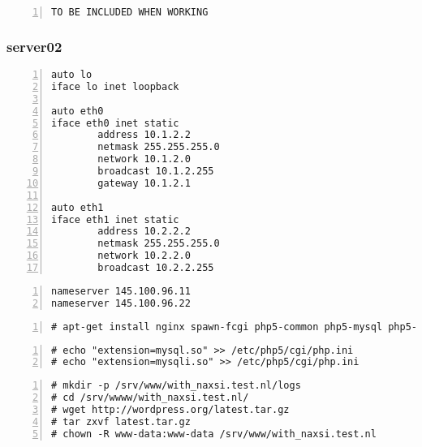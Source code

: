 \documentclass[Configuration]{subfiles}
\begin{document}
\begin{lstlisting}[frame=single,caption=/etc/nginx/nbs.rules,backgroundcolor=\color{gray},breaklines=true,numbers=left,]
TO BE INCLUDED WHEN WORKING
\end{lstlisting}

\subsubsection{server02}
\label{sec:server02_configuration}


\begin{lstlisting}[frame=single,caption=/etc/network/interfaces,backgroundcolor=\color{gray},breaklines=true,numbers=left,]
auto lo
iface lo inet loopback

auto eth0
iface eth0 inet static
        address 10.1.2.2
        netmask 255.255.255.0
        network 10.1.2.0
        broadcast 10.1.2.255
        gateway 10.1.2.1

auto eth1
iface eth1 inet static
        address 10.2.2.2
        netmask 255.255.255.0
        network 10.2.2.0
        broadcast 10.2.2.255
\end{lstlisting}

\begin{lstlisting}[frame=single,caption=/etc/resolv.conf,backgroundcolor=\color{gray},breaklines=true,numbers=left,]
nameserver 145.100.96.11
nameserver 145.100.96.22
\end{lstlisting}

\begin{lstlisting}[frame=single,caption=necessary packages,backgroundcolor=\color{gray},breaklines=true,numbers=left,]
# apt-get install nginx spawn-fcgi php5-common php5-mysql php5-xmlrpc php5-cgi php5-curl php5-gd php5-cli  php-apc php-pear php5-dev php5-imap php5-mcrypt
\end{lstlisting}

\begin{lstlisting}[frame=single,caption=/etc/php5/cgi/php.ini,backgroundcolor=\color{gray},breaklines=true,numbers=left,]
# echo "extension=mysql.so" >> /etc/php5/cgi/php.ini
# echo "extension=mysqli.so" >> /etc/php5/cgi/php.ini
\end{lstlisting}

\begin{lstlisting}[frame=single,caption=Wordpress 3.5.1 installation,backgroundcolor=\color{gray},breaklines=true,numbers=left,]
# mkdir -p /srv/www/with_naxsi.test.nl/logs
# cd /srv/wwww/with_naxsi.test.nl/
# wget http://wordpress.org/latest.tar.gz
# tar zxvf latest.tar.gz 
# chown -R www-data:www-data /srv/www/with_naxsi.test.nl
\end{lstlisting}
\end{document}
